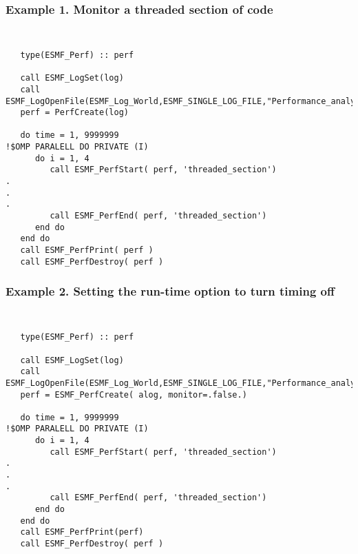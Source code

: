 %



\subsubsection{Example 1. Monitor a threaded section of code}
{\tt
\begin{verbatim}
   type(ESMF_Perf) :: perf

   call ESMF_LogSet(log)
   call ESMF_LogOpenFile(ESMF_Log_World,ESMF_SINGLE_LOG_FILE,"Performance_analysis.txt")
   perf = PerfCreate(log)

   do time = 1, 9999999
!$OMP PARALELL DO PRIVATE (I)
      do i = 1, 4
         call ESMF_PerfStart( perf, 'threaded_section')
.
.
.
         call ESMF_PerfEnd( perf, 'threaded_section')
      end do
   end do
   call ESMF_PerfPrint( perf )
   call ESMF_PerfDestroy( perf )
\end{verbatim}
}
\subsubsection{Example 2. Setting the run-time option to turn timing off}
{\tt
\begin{verbatim}
   type(ESMF_Perf) :: perf

   call ESMF_LogSet(log)
   call ESMF_LogOpenFile(ESMF_Log_World,ESMF_SINGLE_LOG_FILE,"Performance_analysis.txt")
   perf = ESMF_PerfCreate( alog, monitor=.false.)

   do time = 1, 9999999
!$OMP PARALELL DO PRIVATE (I)
      do i = 1, 4
         call ESMF_PerfStart( perf, 'threaded_section')
.
.
.
         call ESMF_PerfEnd( perf, 'threaded_section')
      end do
   end do
   call ESMF_PerfPrint(perf)
   call ESMF_PerfDestroy( perf )
\end{verbatim}
}
